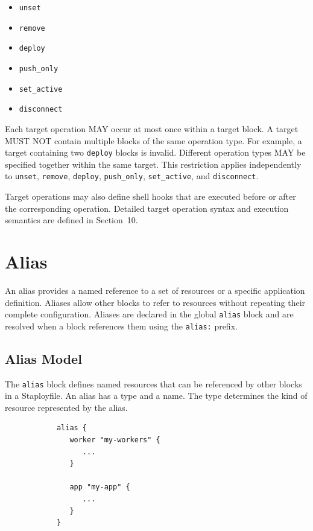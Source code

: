 \documentclass[11pt,a4paper]{article}
\begin{document}
    \begin{itemize}
        \item \texttt{unset}
        \item \texttt{remove}
        \item \texttt{deploy}
        \item \texttt{push\_only}
        \item \texttt{set\_active}
        \item \texttt{disconnect}
    \end{itemize}

    Each target operation MAY occur at most once within a target block.
    A target MUST NOT contain multiple blocks of the same operation type.
    For example, a target containing two \texttt{deploy} blocks is invalid.
    Different operation types MAY be specified together within the same target.
    This restriction applies independently to \texttt{unset}, \texttt{remove}, \texttt{deploy}, \texttt{push\_only}, \texttt{set\_active}, and \texttt{disconnect}.

    Target operations may also define shell hooks that are executed before or after the corresponding operation.
    Detailed target operation syntax and execution semantics are defined in Section~10.


    \section{Alias}\label{sec:alias}

    An alias provides a named reference to a set of resources or a specific application definition.
    Aliases allow other blocks to refer to resources without repeating their complete configuration.
    Aliases are declared in the global \texttt{alias} block and are resolved when a block references them using the \texttt{alias:} prefix.

    \subsection{Alias Model}\label{subsec:alias-model}

    The \texttt{alias} block defines named resources that can be referenced by other blocks in a Staployfile.
    An alias has a type and a name.
    The type determines the kind of resource represented by the alias.

    \begin{center}
        \begin{verbatim}
            alias {
               worker "my-workers" {
                  ...
               }

               app "my-app" {
                  ...
               }
            }
        \end{verbatim}
    \end{center}
\end{document}
